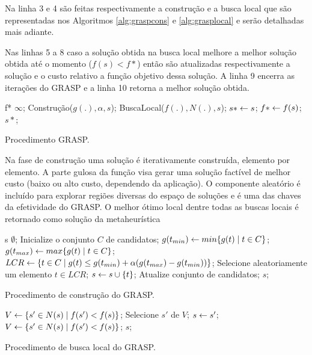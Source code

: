Na linha 3 e 4 são feitas respectivamente a construção e a busca local que são representadas nos Algoritmos \ref{alg:graspcons} e \ref{alg:grasplocal} e serão detalhadas mais adiante.

Nas linhas 5 a 8 caso a solução obtida na busca local melhore a melhor solução obtida até o momento ($f(s) < f{*}$) então são atualizadas respectivamente a solução e o custo relativo a função objetivo dessa solução. 
A linha 9 encerra as iterações do GRASP e a linha 10 retorna a melhor solução obtida.

\begin{pgrm}
\begin{programma}
\STATE f{*} \GETS $\infty$;
\STATE Construção($g(.), \alpha, s$);
\STATE BuscaLocal($f(.),N(.),s$);
\STATE $s{*} \leftarrow s$;
\STATE $f{*} \leftarrow f(s)$;
\ENDIF
\ENDFOR
\STATE\RETURN $s{*}$;
\ENDALGORITHM
\end{programma}
\caption{Procedimento GRASP.}\label{alg:grasp}
\end{pgrm}

Na fase de construção uma solução é iterativamente construída, elemento por elemento. A parte gulosa da função visa gerar uma solução factível de melhor custo (baixo ou alto custo, dependendo da aplicação). O componente aleatório é incluído para explorar
regiões diversas do espaço de soluções e é uma das chaves da efetividade do GRASP.
O melhor ótimo local dentre todas as buscas locais é retornado como solução da metaheurística

\begin{pgrm}
\begin{programma}
\STATE s \GETS $\emptyset$;
\STATE Inicialize o conjunto $C$ de candidatos;
\STATE $g(t_{min}) \leftarrow min\{g(t) \mid t \in C\}$;
\STATE $g(t_{max}) \leftarrow max\{g(t) \mid t \in C\}$;
\STATE $LCR \leftarrow \{t \in C \mid g(t) \leq g(t_{min}) + \alpha(g(t_{max}) - g(t_{min}))\}$;
\STATE Selecione aleatoriamente um elemento $t \in LCR$;
\STATE $s \leftarrow s \cup \{t\}$;
\STATE Atualize conjunto de candidatos;
\ENDWHILE
\STATE\RETURN $s$;
\ENDALGORITHM
\end{programma}
\caption{Procedimento de construção do GRASP.}\label{alg:graspcons}
\end{pgrm}

\begin{pgrm}
\begin{programma}
\STATE $V \leftarrow \{s{'} \in N(s) \mid f(s{'}) < f(s)\}$;
\STATE Selecione $s{'}$ de $V$;
\STATE $s \leftarrow s{'}$;
\STATE $V \leftarrow \{s{'} \in N(s) \mid f(s{'}) < f(s)\}$;
\ENDWHILE
\STATE\RETURN $s$;
\ENDALGORITHM
\end{programma}
\caption{Procedimento de busca local do GRASP.}\label{alg:grasplocal}
\end{pgrm}

